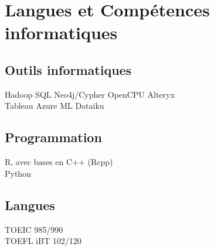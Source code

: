 \documentclass[a4paper]{deedy-resume} %
\begin{document}

\sectionspace %




\sectionspace %
\sectionspace %


\section{Langues et Compétences informatiques}

\begin{minipage}[t]{0.50\textwidth}

\subsection{Outils informatiques}

Hadoop \textbullet{} SQL \textbullet{} Neo4j/Cypher \textbullet{} OpenCPU \textbullet{} Alteryx\\
Tableau \textbullet{} Azure ML \textbullet{} Dataiku \\

\end{minipage}
\begin{minipage}[t]{0.29\textwidth}

\subsection{Programmation}

R, avec bases en C++ (Rcpp) \\
Python \\

\end{minipage}
\begin{minipage}[t]{0.20\textwidth}
\subsection{Langues}

TOEIC 985/990 \\
TOEFL iBT 102/120 \\

\end{minipage}
\end{document}
